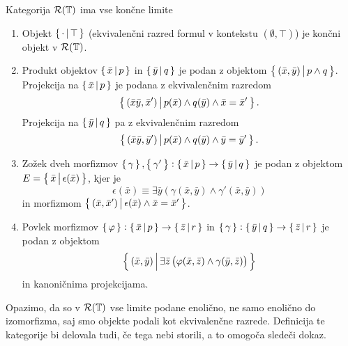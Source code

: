 \documentclass[../kategoricna_logika.tex]{subfiles}
\begin{document}
\begin{lema}\label{lema:limite-v-interni-logiki}
  Kategorija $\mathcal{R}(\mathbb{T})$ ima vse končne limite
  \begin{enumerate}[label=(\roman*)]
  \item Objekt $\left\lbrace\,\cdot \,\middle|\, \top\,\right\rbrace$ (ekvivalenčni razred
    formul v kontekstu $(\emptyset, \top)$) je končni objekt v
    $\mathcal{R}(\mathbb{T})$.
  \item Produkt objektov $\left\lbrace\,\bar{x}\,\middle|\, p\,\right\rbrace$ in
    $\left\lbrace\,\bar{y}\,\middle|\, q\,\right\rbrace$ je podan z objektom
    $\left\lbrace\,(\bar{x},\bar{y})\,\middle|\, p \wedge q\,\right\rbrace$.  Projekcija na
    $\left\lbrace\,\bar{x}\,\middle|\, p\,\right\rbrace$ je podana z ekvivalenčnim razredom
      $$\left\lbrace\,(\bar{x}\bar{y},\bar{x}')\,\middle|\, p(\bar{x}) \wedge q(\bar{y}) \wedge \bar{x} = \bar{x}'\,\right\rbrace.$$
      Projekcija na $\left\lbrace\,\bar{y}\,\middle|\, q\,\right\rbrace$ pa z ekvivalenčnim
      razredom
      $$\left\lbrace\,(\bar{x}\bar{y},\bar{y}')\,\middle|\, p(\bar{x}) \wedge q(\bar{y}) \wedge \bar{y} = \bar{y}'\,\right\rbrace.$$
    \item Zožek dveh morfizmov
      $\left\lbrace\,\gamma\,\right\rbrace, \left\lbrace\,\gamma'\,\right\rbrace : \left\lbrace\,\bar{x}\,\middle|\, p\,\right\rbrace \to
      \left\lbrace\,\bar{y}\,\middle|\, q\,\right\rbrace$ je podan z objektom
      $E = \left\lbrace\,\bar{x}\,\middle|\, \epsilon(\bar{x})\,\right\rbrace$, kjer je
      $$\epsilon(\bar{x}) \equiv \exists \bar{y}\left(\gamma(\bar{x},\bar{y}) \wedge \gamma'(\bar{x},\bar{y})\right)$$
      in morfizmom
      $\left\lbrace\,(\bar{x},\bar{x}')\,\middle|\, \epsilon(\bar{x}) \wedge
        \bar{x} = \bar{x}'\,\right\rbrace$.
    \item Povlek morfizmov
      $\left\lbrace\,\varphi\,\right\rbrace : \left\lbrace\,\bar{x}\,\middle|\, p\,\right\rbrace \to
      \left\lbrace\,\bar{z}\,\middle|\, r\,\right\rbrace$ in
      $\left\lbrace\,\gamma\,\right\rbrace : \left\lbrace\,\bar{y}\,\middle|\, q\,\right\rbrace \to
      \left\lbrace\,\bar{z}\,\middle|\, r\,\right\rbrace$ je podan z objektom
      $$\left\lbrace\,(\bar{x},\bar{y})\,\middle|\, \exists \bar{z} \left(\varphi(\bar{x},\bar{z}) \wedge \gamma(\bar{y},\bar{z})\right)\,\right\rbrace$$
      in kanoničnima projekcijama.
    \end{enumerate}
  \end{lema}
  \begin{opomba}
    Opazimo, da so v $\mathcal{R}(\mathbb{T})$ vse limite podane enolično, ne
    samo enolično do izomorfizma, saj smo objekte podali kot
    ekvivalenčne razrede. Definicija te kategorije bi delovala tudi, če
    tega nebi storili, a to omogoča sledeči dokaz.
  \end{opomba}
\end{document}
